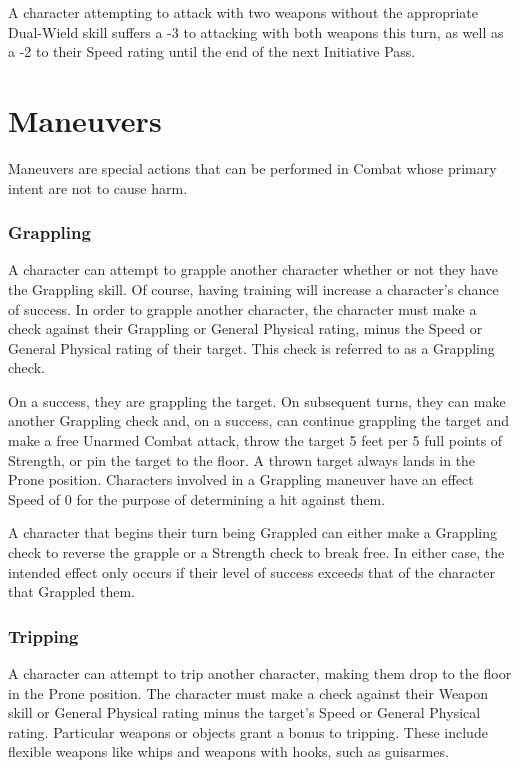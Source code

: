 \documentclass[oneside]{book}
\begin{document}
\begin{multicols}{2}
A character attempting to attack with two weapons without the appropriate Dual-Wield skill suffers a -3 to attacking with both weapons this turn, as well as a -2 to their Speed rating until the end of the next Initiative Pass. 

\section{Maneuvers}
Maneuvers are special actions that can be performed in Combat whose primary intent are not to cause harm. 

\subsubsection{Grappling}
A character can attempt to grapple another character whether or not they have the Grappling skill. Of course, having training will increase a character's chance of success. In order to grapple another character, the character must make a check against their Grappling or General Physical rating, minus the Speed or General Physical rating of their target. This check is referred to as a Grappling check. 

On a success, they are grappling the target. On subsequent turns, they can make another Grappling check and, on a success, can continue grappling the target and make a free Unarmed Combat attack, throw the target 5 feet per 5 full points of Strength, or pin the target to the floor. A thrown target always lands in the Prone position. Characters involved in a Grappling maneuver have an effect Speed of 0 for the purpose of determining a hit against them.

A character that begins their turn being Grappled can either make a Grappling check to reverse the grapple or a Strength check to break free. In either case, the intended effect only occurs if their level of success exceeds that of the character that Grappled them. 


\subsubsection{Tripping}
A character can attempt to trip another character, making them drop to the floor in the Prone position. The character must make a check against their Weapon skill or General Physical rating minus the target's Speed or General Physical rating. Particular weapons or objects grant a bonus to tripping. These include flexible weapons like whips and weapons with hooks, such as guisarmes.


\end{multicols}
\end{document}
